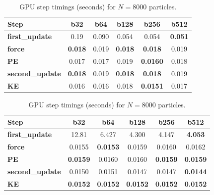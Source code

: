 \begin{table}[H]
\centering
\begin{minipage}[t]{0.48\textwidth}
\centering
\begin{tabular}{|l|c|c|c|c|c|}
\hline
\textbf{Step} & \textbf{b32} & \textbf{b64} & \textbf{b128} & \textbf{b256} & \textbf{b512} \\
\hline
\textbf{first\_update} & 0.19 & 0.090 & 0.054 & 0.054 & \textbf{0.051} \\
\textbf{force} & \textbf{0.018} & 0.019 & \textbf{0.018} & \textbf{0.018} & 0.019 \\
\textbf{PE} & 0.017 & 0.017 & 0.019 & \textbf{0.0160} & 0.018 \\
\textbf{second\_update} & \textbf{0.018} & 0.019 & \textbf{0.018} & \textbf{0.018} & 0.019 \\
\textbf{KE} & 0.016 & 0.016 & 0.018 & \textbf{0.0151} & 0.017 \\
\hline
\end{tabular}
\caption{GPU step timings (seconds) for $N=1000$ particles.}
\label{tab:gpu-steps-1000}
\end{minipage}
\hfill
\begin{minipage}[t]{0.48\textwidth}
\centering
\begin{tabular}{|l|c|c|c|c|c|}
\hline
\textbf{Step} & \textbf{b32} & \textbf{b64} & \textbf{b128} & \textbf{b256} & \textbf{b512} \\
\hline
\textbf{first\_update} & 12.81 & 6.427 & 4.300 & 4.147 & \textbf{4.053} \\
\textbf{force} & 0.0155 & \textbf{0.0153} & 0.0159 & 0.0160 & 0.0162 \\
\textbf{PE} & \textbf{0.0159} & 0.0160 & 0.0160 & \textbf{0.0159} & \textbf{0.0159} \\
\textbf{second\_update} & 0.0150 & 0.0151 & 0.0147 & 0.0147 & \textbf{0.0144} \\
\textbf{KE} & \textbf{0.0152} & \textbf{0.0152} & \textbf{0.0152} & \textbf{0.0152} & \textbf{0.0152} \\
\hline
\end{tabular}
\caption{GPU step timings (seconds) for $N=8000$ particles.}
\label{tab:gpu-steps-8000}
\end{minipage}
\end{table}
